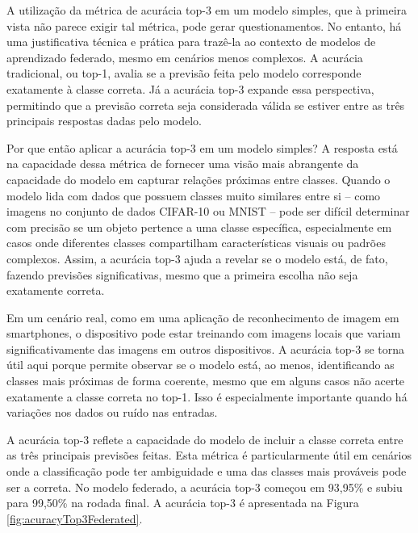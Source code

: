A utilização da métrica de acurácia top-3 em um modelo simples, que à primeira vista não parece exigir tal métrica, pode gerar questionamentos. No entanto, há uma justificativa técnica e prática para trazê-la ao contexto de modelos de aprendizado federado, mesmo em cenários menos complexos. A acurácia tradicional, ou top-1, avalia se a previsão feita pelo modelo corresponde exatamente à classe correta. Já a acurácia top-3 expande essa perspectiva, permitindo que a previsão correta seja considerada válida se estiver entre as três principais respostas dadas pelo modelo.

Por que então aplicar a acurácia top-3 em um modelo simples? A resposta está na capacidade dessa métrica de fornecer uma visão mais abrangente da capacidade do modelo em capturar relações próximas entre classes. Quando o modelo lida com dados que possuem classes muito similares entre si – como imagens no conjunto de dados CIFAR-10 ou MNIST – pode ser difícil determinar com precisão se um objeto pertence a uma classe específica, especialmente em casos onde diferentes classes compartilham características visuais ou padrões complexos. Assim, a acurácia top-3 ajuda a revelar se o modelo está, de fato, fazendo previsões significativas, mesmo que a primeira escolha não seja exatamente correta.

Em um cenário real, como em uma aplicação de reconhecimento de imagem em smartphones, o dispositivo pode estar treinando com imagens locais que variam significativamente das imagens em outros dispositivos. A acurácia top-3 se torna útil aqui porque permite observar se o modelo está, ao menos, identificando as classes mais próximas de forma coerente, mesmo que em alguns casos não acerte exatamente a classe correta no top-1. Isso é especialmente importante quando há variações nos dados ou ruído nas entradas.

A acurácia top-3 reflete a capacidade do modelo de incluir a classe correta entre as três principais previsões feitas. Esta métrica é particularmente útil em cenários onde a classificação pode ter ambiguidade e uma das classes mais prováveis pode ser a correta. No modelo federado, a acurácia top-3 começou em 93,95\% e subiu para 99,50\% na rodada final. A acurácia top-3 é apresentada na Figura \ref{fig:acuracyTop3Federated}.

